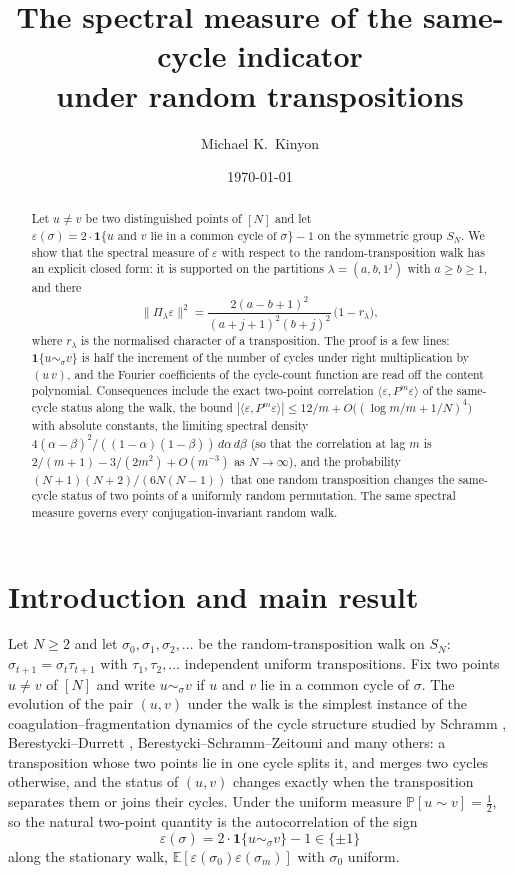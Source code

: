 \documentclass[11pt]{amsart}
\title[Same-cycle indicator under random transpositions]{The spectral measure of the same-cycle indicator\\ under random transpositions}
\author{Michael K.\ Kinyon}
\date{\today}
\theoremstyle{remark}
\newcommand{\E}{\mathbb{E}}
\renewcommand{\Pr}{\mathbb{P}}
\begin{document}
\begin{abstract}
Let $u\neq v$ be two distinguished points of $[N]$ and let $\varepsilon(\sigma)=2\cdot\mathbf 1\{u\text{ and }v\text{ lie in a common cycle of }\sigma\}-1$ on the symmetric group $S_N$.  We show that the spectral measure of $\varepsilon$ with respect to the random-transposition walk has an explicit closed form: it is supported on the partitions $\lambda=(a,b,1^j)$ with $a\ge b\ge1$, and there
\[
\|\Pi_\lambda\varepsilon\|^2=\frac{2(a-b+1)^2}{(a+j+1)^2(b+j)^2}\,\bigl(1-r_\lambda\bigr),
\]
where $r_\lambda$ is the normalised character of a transposition.  The proof is a few lines: $\mathbf 1\{u\sim_\sigma v\}$ is half the increment of the number of cycles under right multiplication by $(u\,v)$, and the Fourier coefficients of the cycle-count function are read off the content polynomial.  Consequences include the exact two-point correlation $\langle\varepsilon,P^m\varepsilon\rangle$ of the same-cycle status along the walk, the bound $|\langle\varepsilon,P^m\varepsilon\rangle|\le 12/m+O\bigl((\log m/m+1/N)^4\bigr)$ with absolute constants, the limiting spectral density $4(\alpha-\beta)^2/((1-\alpha)(1-\beta))\,d\alpha\,d\beta$ (so that the correlation at lag $m$ is $2/(m+1)-3/(2m^2)+O(m^{-3})$ as $N\to\infty$), and the probability $(N+1)(N+2)/(6N(N-1))$ that one random transposition changes the same-cycle status of two points of a uniformly random permutation.  The same spectral measure governs every conjugation-invariant random walk.
\end{abstract}

\maketitle

\section{Introduction and main result}

Let $N\ge2$ and let $\sigma_0,\sigma_1,\sigma_2,\dots$ be the random-transposition walk on $S_N$: $\sigma_{t+1}=\sigma_t\tau_{t+1}$ with $\tau_1,\tau_2,\dots$ independent uniform transpositions.  Fix two points $u\ne v$ of $[N]$ and write $u\sim_\sigma v$ if $u$ and $v$ lie in a common cycle of $\sigma$.  The evolution of the pair $(u,v)$ under the walk is the simplest instance of the coagulation--fragmentation dynamics of the cycle structure studied by Schramm \cite{Sch05}, Berestycki--Durrett \cite{BD06}, Berestycki--Schramm--Zeitouni \cite{BSZ11} and many others: a transposition whose two points lie in one cycle splits it, and merges two cycles otherwise, and the status of $(u,v)$ changes exactly when the transposition separates them or joins their cycles.  Under the uniform measure $\Pr[u\sim v]=\tfrac12$, so the natural two-point quantity is the autocorrelation of the sign
\[
\varepsilon(\sigma)=2\cdot\mathbf 1\{u\sim_\sigma v\}-1\in\{\pm1\}
\]
along the stationary walk, $\E[\varepsilon(\sigma_0)\varepsilon(\sigma_m)]$ with $\sigma_0$ uniform.
\end{document}
